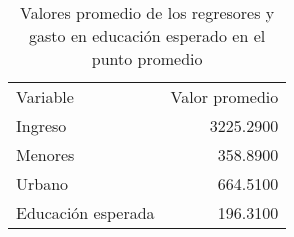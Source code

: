\begin{table}[H]
    \centering
    \color{blue}
    \caption{Valores promedio de los regresores y gasto en educación esperado en el punto promedio}
    \label{tab:prediccion_media}
    \begin{tabular}{lr}
        
        Variable & Valor promedio \\
        
        Ingreso              & 3225.2900 \\
        Menores              &  358.8900 \\
        Urbano               &  664.5100 \\
        Educación esperada   &  196.3100 \\
        
    \end{tabular}
\end{table}
